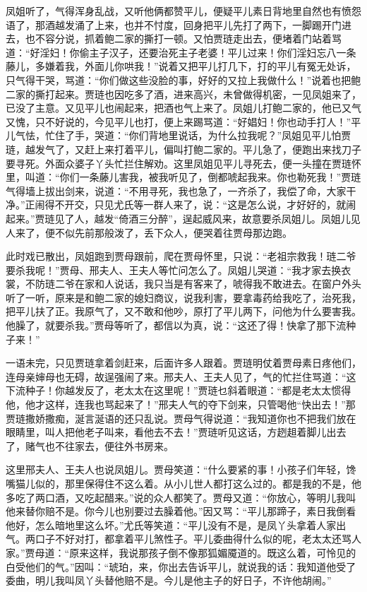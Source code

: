 \documentclass[12pt,oneside]{book}
\begin{document}
凤姐听了，气得浑身乱战，又听他俩都赞平儿，便疑平儿素日背地里自然也有愤怨语了，那酒越发涌了上来，也并不忖度，回身把平儿先打了两下，一脚踢开门进去，也不容分说，抓着鲍二家的撕打一顿。又怕贾琏走出去，便堵着门站着骂道：“好淫妇！你偷主子汉子，还要治死主子老婆！平儿过来！你们淫妇忘八一条藤儿，多嫌着我，外面儿你哄我！”说着又把平儿打几下，打的平儿有冤无处诉，只气得干哭，骂道：“你们做这些没脸的事，好好的又拉上我做什么！”说着也把鲍二家的撕打起来。贾琏也因吃多了酒，进来高兴，未曾做得机密，一见凤姐来了，已没了主意。又见平儿也闹起来，把酒也气上来了。凤姐儿打鲍二家的，他已又气又愧，只不好说的，今见平儿也打，便上来踢骂道：“好娼妇！你也动手打人！”平儿气怯，忙住了手，哭道：“你们背地里说话，为什么拉我呢？”凤姐见平儿怕贾琏，越发气了，又赶上来打着平儿，偏叫打鲍二家的。平儿急了，便跑出来找刀子要寻死。外面众婆子丫头忙拦住解劝。这里凤姐见平儿寻死去，便一头撞在贾琏怀里，叫道：“你们一条藤儿害我，被我听见了，倒都唬起我来。你也勒死我！”贾琏气得墙上拔出剑来，说道：“不用寻死，我也急了，一齐杀了，我偿了命，大家干净。”正闹得不开交，只见尤氏等一群人来了，说：“这是怎么说，才好好的，就闹起来。”贾琏见了人，越发“倚酒三分醉”，逞起威风来，故意要杀凤姐儿。凤姐儿见人来了，便不似先前那般泼了，丢下众人，便哭着往贾母那边跑。

此时戏已散出，凤姐跑到贾母跟前，爬在贾母怀里，只说：“老祖宗救我！琏二爷要杀我呢！”贾母、邢夫人、王夫人等忙问怎么了。凤姐儿哭道：“我才家去换衣裳，不防琏二爷在家和人说话，我只当是有客来了，唬得我不敢进去。在窗户外头听了一听，原来是和鲍二家的媳妇商议，说我利害，要拿毒药给我吃了，治死我，把平儿扶了正。我原气了，又不敢和他吵，原打了平儿两下，问他为什么要害我。他臊了，就要杀我。”贾母等听了，都信以为真，说：“这还了得！快拿了那下流种子来！”

一语未完，只见贾琏拿着剑赶来，后面许多人跟着。贾琏明仗着贾母素日疼他们，连母亲婶母也无碍，故逞强闹了来。邢夫人、王夫人见了，气的忙拦住骂道：“这下流种子！你越发反了，老太太在这里呢！”贾琏乜斜着眼道：“都是老太太惯得他，他才这样，连我也骂起来了！”邢夫人气的夺下剑来，只管喝他“快出去！”那贾琏撒娇撒痴，涎言涎语的还只乱说。贾母气得说道：“我知道你也不把我们放在眼睛里，叫人把他老子叫来，看他去不去！”贾琏听见这话，方趔趄着脚儿出去了，赌气也不往家去，便往外书房来。

这里邢夫人、王夫人也说凤姐儿。贾母笑道：“什么要紧的事！小孩子们年轻，馋嘴猫儿似的，那里保得住不这么着。从小儿世人都打这么过的。都是我的不是，他多吃了两口酒，又吃起醋来。”说的众人都笑了。贾母又道：“你放心，等明儿我叫他来替你赔不是。你今儿也别要过去臊着他。”因又骂：“平儿那蹄子，素日我倒看他好，怎么暗地里这么坏。”尤氏等笑道：“平儿没有不是，是凤丫头拿着人家出气。两口子不好对打，都拿着平儿煞性子。平儿委曲得什么似的呢，老太太还骂人家。”贾母道：“原来这样，我说那孩子倒不像那狐媚魇道的。既这么着，可怜见的白受他们的气。”因叫：“琥珀，来，你出去告诉平儿，就说我的话：我知道他受了委曲，明儿我叫凤丫头替他赔不是。今儿是他主子的好日子，不许他胡闹。”
\end{document}
